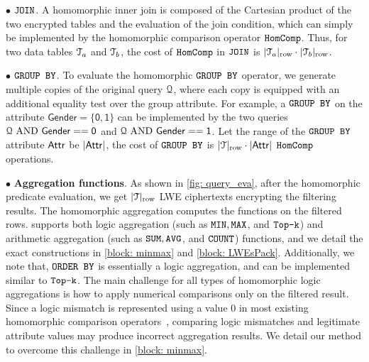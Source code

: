 $\bullet$ $\boldsymbol{\texttt{JOIN}}$.
A homomorphic inner join is composed of 
the Cartesian product of the two encrypted tables
and the evaluation of the join condition, which can simply be 
implemented by the homomorphic comparison operator $\texttt{HomComp}$.
Thus, for two data tables $\mathcal{T}_{a}$ and $\mathcal{T}_{b}$, 
the cost of $\texttt{HomComp}$ in $\texttt{JOIN}$ is 
$\lvert {\mathcal{T}_a} \rvert_{\rm row} \cdot \lvert {\mathcal{T}_b} \rvert_{\rm row}$.

$\bullet$ $\boldsymbol{\texttt{GROUP BY}}$.
To evaluate the homomorphic $\texttt{GROUP BY}$ operator,
we generate multiple copies of the original query $\mathcal{Q}$, 
where each copy is equipped with an additional equality test over the group 
attribute. For example, a $\texttt{GROUP BY}$ on the attribute $\mathsf{Gender = \{0,1\}}$ 
can be implemented by the two queries $\mathcal{Q}\text{ } {\rm {AND}} \text{ }\mathsf{Gender == 0}$
and $\mathcal{Q}\text{ } {\rm {AND}} \text{ }\mathsf{Gender == 1}$.
Let the range of the $\texttt{GROUP BY}$ attribute $\mathsf{Attr}$ be $\lvert {\mathsf{Attr}} \rvert$,
the cost of $\texttt{GROUP BY}$ is $|\mathcal{T}|_{\rm row} \cdot \lvert {\mathsf{Attr}} \rvert$ $\texttt{HomComp}$ operations.

$\bullet$ \textbf{Aggregation functions}.
As shown in \cref{fig: query_eva},
after the homomorphic predicate evaluation, 
we get $|\mathcal{T}|_{\rm row}$
LWE ciphertexts encrypting the filtering results.
The homomorphic aggregation computes the functions
on the filtered rows.
\NAME supports both logic aggregation 
(such as $\texttt{MIN}, \texttt{MAX}$, and $\texttt{Top-k}$)
and arithmetic aggregation 
(such as $\texttt{SUM}, \texttt{AVG}$, and $\texttt{COUNT}$) functions,
and we detail the exact constructions in \cref{block: minmax} and \cref{block: LWEsPack}.
Additionally,  we note that, $\texttt{ORDER BY}$ is
essentially a logic aggregation, and can be implemented similar to
$\texttt{Top-k}$.
The main challenge for all types of homomorphic logic aggregations is how to apply 
numerical comparisons
only on the filtered result. Since a logic mismatch is represented
using a value 0 in most existing homomorphic comparison 
operators~\cite{pegasus,sortinghat},  comparing
logic mismatches and legitimate attribute values may produce incorrect aggregation 
results. 
We detail our method to overcome this challenge in \cref{block: minmax}.